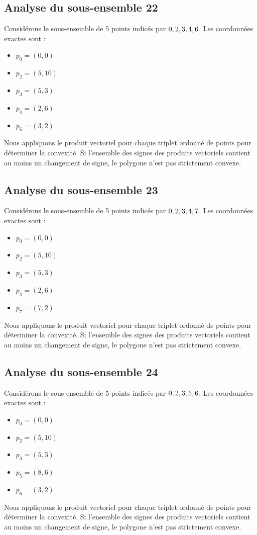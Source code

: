 \documentclass[11pt]{article}
\begin{document}
\subsection{Analyse du sous-ensemble 22}
Considérons le sous-ensemble de 5 points indicés par $\\{ 0, 2, 3, 4, 6 \\}$.
Les coordonnées exactes sont :
\begin{itemize}
\item $p_0 = (0, 0)$
\item $p_2 = (5, 10)$
\item $p_3 = (5, 3)$
\item $p_4 = (2, 6)$
\item $p_6 = (3, 2)$
\end{itemize}
Nous appliquons le produit vectoriel pour chaque triplet ordonné de points pour déterminer la convexité. Si l'ensemble des signes des produits vectoriels contient au moins un changement de signe, le polygone n'est pas strictement convexe.
\newpage

\subsection{Analyse du sous-ensemble 23}
Considérons le sous-ensemble de 5 points indicés par $\\{ 0, 2, 3, 4, 7 \\}$.
Les coordonnées exactes sont :
\begin{itemize}
\item $p_0 = (0, 0)$
\item $p_2 = (5, 10)$
\item $p_3 = (5, 3)$
\item $p_4 = (2, 6)$
\item $p_7 = (7, 2)$
\end{itemize}
Nous appliquons le produit vectoriel pour chaque triplet ordonné de points pour déterminer la convexité. Si l'ensemble des signes des produits vectoriels contient au moins un changement de signe, le polygone n'est pas strictement convexe.
\newpage

\subsection{Analyse du sous-ensemble 24}
Considérons le sous-ensemble de 5 points indicés par $\\{ 0, 2, 3, 5, 6 \\}$.
Les coordonnées exactes sont :
\begin{itemize}
\item $p_0 = (0, 0)$
\item $p_2 = (5, 10)$
\item $p_3 = (5, 3)$
\item $p_5 = (8, 6)$
\item $p_6 = (3, 2)$
\end{itemize}
Nous appliquons le produit vectoriel pour chaque triplet ordonné de points pour déterminer la convexité. Si l'ensemble des signes des produits vectoriels contient au moins un changement de signe, le polygone n'est pas strictement convexe.
\newpage
\end{document}
